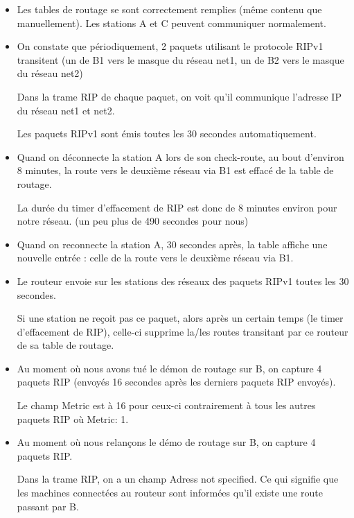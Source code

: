 \documentclass{article}
\begin{document}
\begin{itemize}\renewcommand{\labelitemi}{$\bullet$}
\item Les tables de routage se sont correctement remplies (même contenu que manuellement). 
Les stations A et C peuvent communiquer normalement.
\item On constate que périodiquement, 2 paquets utilisant le protocole RIPv1 transitent (un de B1 vers le masque du réseau net1, un de B2 vers le masque du réseau net2)

Dans la trame RIP de chaque paquet, on voit qu'il communique l'adresse IP du réseau net1 et net2.

Les paquets RIPv1 sont émis toutes les 30 secondes automatiquement.

\item Quand on déconnecte la station A lors de son check-route, au bout d'environ 8 minutes, la route vers le deuxième réseau via B1 est effacé de la table de routage.

La durée du timer d'effacement de RIP est donc de 8 minutes environ pour notre réseau. (un peu plus de 490 secondes pour nous)

\item Quand on reconnecte la station A, 30 secondes après, la table affiche une nouvelle entrée : celle de la route vers le deuxième réseau via B1.

\item Le routeur envoie sur les stations des réseaux des paquets RIPv1 toutes les 30 secondes. 

Si une station ne reçoit pas ce paquet, alors après un certain temps (le timer d'effacement de RIP), celle-ci supprime la/les routes transitant par ce routeur de sa table de routage.

\item Au moment où nous avons tué le démon de routage sur B, on capture 4 paquets RIP (envoyés 16 secondes après les derniers paquets RIP envoyés).

Le champ Metric est à 16 pour ceux-ci contrairement à tous les autres paquets RIP où Metric: 1.

\item Au moment où nous relançons le démo de routage sur B, on capture 4 paquets RIP.

Dans la trame RIP, on a un champ Adress not specified. Ce qui signifie que les machines connectées au routeur sont informées qu'il existe une route passant par B.

\end{itemize}
\end{document}
